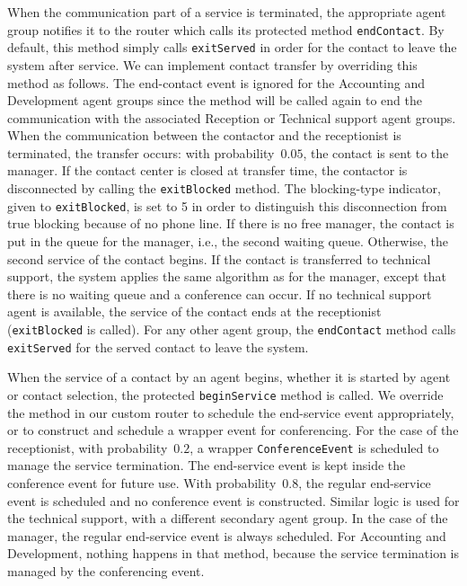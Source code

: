 When the communication part of a service is terminated, the
appropriate
agent group notifies it to the router which calls its protected method
\texttt{end\-Contact}.  By default, this method simply calls
\texttt{exit\-Served} in order for the contact to leave the system after
service.  We can implement contact transfer by overriding this method
as follows.  The end-contact event is ignored for the Accounting and
Development agent
groups since the method will be called again to end the communication
with the associated Reception or Technical support agent groups. When
the communication between the contactor and the receptionist is
terminated, the transfer occurs: with probability~$0.05$, the contact is
sent to the manager.  If the contact center is closed at transfer time,
the contactor is disconnected by calling the \texttt{exit\-Blocked}
method.
The blocking-type indicator, given to \texttt{exit\-Blocked}, is set
to 5 in order to distinguish this disconnection from true
blocking because of no phone line.
If there is no free manager, the contact is put
in the queue for the manager, i.e., the second waiting queue.  Otherwise,
the second service of the contact begins.
If the contact is transferred to technical support,
the system applies the same algorithm as for the manager, except
that there is no waiting queue and a conference can occur.  If no
technical support agent is available, the service of
the contact ends at the receptionist (\texttt{exitBlocked} is called).
For any other agent group, the \texttt{end\-Contact} method
calls \texttt{exit\-Served} for the served contact to leave the system.

When the service of a
contact by an agent begins, whether it is started by agent or contact
selection, the protected \texttt{begin\-Service}
method is called.  We override the method in our custom router to
schedule the
end-service event appropriately, or to construct and schedule a
wrapper event for conferencing.  For the case of the receptionist,
with probability~$0.2$, a wrapper
\texttt{Conference\-Event} is scheduled to manage the service
termination.  The end-service event is kept inside the conference event
for future use.
With probability~$0.8$, the regular end-service event is scheduled and
no conference event is constructed.
Similar logic is used for the technical support, with a different
secondary agent group.  In the case of the manager, the regular
end-service event is always scheduled.
For Accounting and Development, nothing happens in that method,
because the service termination is managed by the conferencing event.

